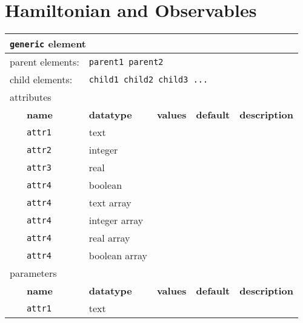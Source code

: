 \chapter{Hamiltonian and Observables}



\begin{table}[h]
\begin{center}
\begin{tabularx}{\textwidth}{l l l l l l }
\hline
\multicolumn{6}{l}{\texttt{generic} element} \\
\hline
\multicolumn{2}{l}{parent elements:} & \multicolumn{4}{l}{\texttt{parent1 parent2}}\\
\multicolumn{2}{l}{child  elements:} & \multicolumn{4}{l}{\texttt{child1 child2 child3 ...}}\\
\multicolumn{2}{l}{attributes}  & \multicolumn{4}{l}{}\\
   &   \bfseries name     & \bfseries datatype & \bfseries values & \bfseries default   & \bfseries description \\
   &   \texttt{attr1}     &  text              &                  &                     &                       \\
   &   \texttt{attr2}     &  integer           &                  &                     &                       \\
   &   \texttt{attr3}     &  real              &                  &                     &                       \\
   &   \texttt{attr4}     &  boolean           &                  &                     &                       \\
   &   \texttt{attr4}     &  text array        &                  &                     &                       \\
   &   \texttt{attr4}     &  integer array     &                  &                     &                       \\
   &   \texttt{attr4}     &  real array        &                  &                     &                       \\
   &   \texttt{attr4}     &  boolean array     &                  &                     &                       \\
\multicolumn{2}{l}{parameters}  & \multicolumn{4}{l}{}\\
   &   \bfseries name     & \bfseries datatype & \bfseries values & \bfseries default   & \bfseries description \\
   &   \texttt{attr1}     &  text              &                  &                     &                       \\

\end{tabularx}
\end{center}
\end{table}
